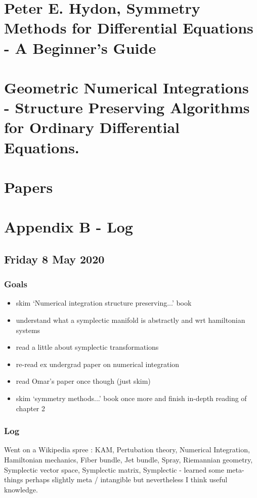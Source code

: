 \documentclass[12pt]{article}
\begin{document}
\newpage
\appendix

\section{Peter E. Hydon, Symmetry Methods for Differential Equations - A Beginner's Guide}

\section{Geometric Numerical Integrations - Structure Preserving Algorithms for Ordinary Differential Equations.}

\section{Papers}

\section{Appendix B - Log}

\subsection{Friday 8 May 2020}
\subsubsection{Goals}
\begin{itemize}
    \item skim `Numerical integration structure preserving...' book
    \item understand what a symplectic manifold is abstractly and wrt hamiltonian systems
    \item read a little about symplectic transformations
    \item re-read ex undergrad paper on numerical integration
    \item read Omar's paper once though (just skim)
    \item skim `symmetry methods...' book once more and finish in-depth reading of chapter 2
\end{itemize}

\subsubsection{Log}
Went on a Wikipedia spree : KAM, Pertubation theory, Numerical Integration, Hamiltonian mechanics, Fiber bundle, Jet bundle, Spray, Riemannian geometry, Symplectic vector space, Symplectic matrix, Symplectic - learned some meta-things perhaps slightly meta / intangible but nevertheless I think useful knowledge. 
\end{document}
